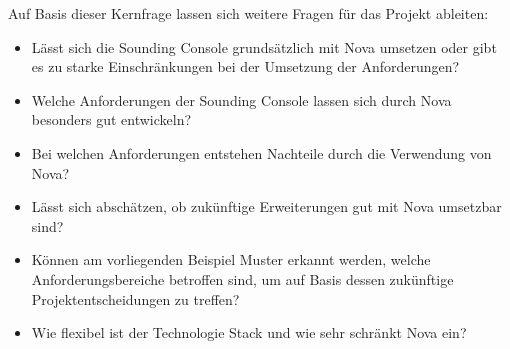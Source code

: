 Auf Basis dieser Kernfrage lassen sich weitere Fragen für das Projekt ableiten:
\begin{itemize}
    \item Lässt sich die Sounding Console grundsätzlich mit Nova umsetzen oder gibt es zu starke Einschränkungen bei der Umsetzung der Anforderungen?
    \item Welche Anforderungen der Sounding Console lassen sich durch Nova besonders gut entwickeln?
    \item Bei welchen Anforderungen entstehen Nachteile durch die Verwendung von Nova?
    \item Lässt sich abschätzen, ob zukünftige Erweiterungen gut mit Nova umsetzbar sind?
    \item Können am vorliegenden Beispiel Muster erkannt werden, welche Anforderungsbereiche betroffen sind, um auf Basis dessen zukünftige Projektentscheidungen zu treffen?
    \item Wie flexibel ist der Technologie Stack und wie sehr schränkt Nova ein?
\end{itemize}
